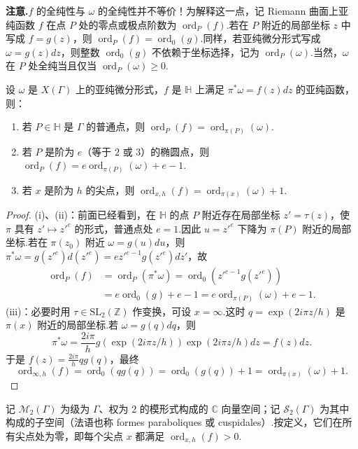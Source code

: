 \textbf{注意.}$f$ 的全纯性与 $\omega$ 的全纯性并不等价！为解释这一点，记 Riemann 曲面上亚纯函数 $f$ 在点 $P$ 处的零点或极点阶数为 $\operatorname{ord}_P(f)$.若在 $P$ 附近的局部坐标 $z$ 中写成 $f=g(z)$，则 $\operatorname{ord}_P(f)=\operatorname{ord}_0(g)$.同样，若亚纯微分形式写成 $\omega=g(z)dz$，则整数 $\operatorname{ord}_0(g)$ 不依赖于坐标选择，记为 $\operatorname{ord}_P(\omega)$.当然，$\omega$ 在 $P$ 处全纯当且仅当 $\operatorname{ord}_P(\omega)\ge0$.
\begin{lemma*}
设 $\omega$ 是 $X(\Gamma)$ 上的亚纯微分形式，$f$ 是 $\mathbb H$ 上满足 $\pi^*\omega=f(z)dz$ 的亚纯函数，则：
\begin{enumerate}[label=\roman*)]
\item 若 $P\in\mathbb H$ 是 $\Gamma$ 的普通点，则 $\operatorname{ord}_P(f)=\operatorname{ord}_{\pi(P)}(\omega)$.
\item 若 $P$ 是阶为 $e$（等于 $2$ 或 $3$）的椭圆点，则 $\operatorname{ord}_P(f)=e\operatorname{ord}_{\pi(P)}(\omega)+e-1$.
\item 若 $x$ 是阶为 $h$ 的尖点，则 $\operatorname{ord}_{x,h}(f)=\operatorname{ord}_{\pi(x)}(\omega)+1$.
\end{enumerate}
\end{lemma*}
\begin{proof}
(i)、(ii)：前面已经看到，在 $\mathbb H$ 的点 $P$ 附近存在局部坐标 $z'=\tau(z)$，使 $\pi$ 具有 $z'\mapsto z'^e$ 的形式，普通点处 $e=1$.因此 $u=z'^e$ 下降为 $\pi(P)$ 附近的局部坐标.若在 $\pi(z_0)$ 附近 $\omega=g(u)du$，则 $\pi^*\omega=g(z'^e)d(z'^e)=ez'^{e-1}g(z'^e)dz'$，故
\begin{align*}
\operatorname{ord}_P(f)&=\operatorname{ord}_P(\pi^*\omega)=\operatorname{ord}_0(z'^{e-1}g(z'^e))\\
&=e\operatorname{ord}_0(g)+e-1=e\operatorname{ord}_{\pi(P)}(\omega)+e-1.
\end{align*}
(iii)：必要时用 $\tau\in\mathrm{SL}_2(\mathbb Z)$ 作变换，可设 $x=\infty$.这时 $q=\exp(2i\pi z/h)$ 是 $\pi(x)$ 附近的局部坐标.若 $\omega=g(q)dq$，则
\[
\pi^*\omega=\frac{2i\pi}{h}g(\exp(2i\pi z/h))\exp(2i\pi z/h)dz=f(z)dz.
\]
于是 $f(z)=\frac{2i\pi}{h}qg(q)$，最终
\[
\operatorname{ord}_{\infty,h}(f)=\operatorname{ord}_0(qg(q))=\operatorname{ord}_0(g(q))+1=\operatorname{ord}_{\pi(x)}(\omega)+1.
\]
\end{proof}
记 $\mathcal M_2(\Gamma)$ 为级为 $\Gamma$、权为 $2$ 的模形式构成的 $\mathbb C$ 向量空间；记 $\mathcal S_2(\Gamma)$ 为其中构成的子空间（法语也称 formes paraboliques 或 cuspidales）.按定义，它们在所有尖点处为零，即每个尖点 $x$ 都满足 $\operatorname{ord}_{x,h}(f)>0$.

